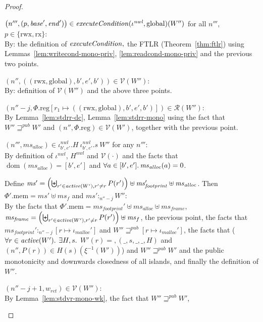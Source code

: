 \documentclass[a4paper]{article}
\newcommand{\update}[2]{[#1 \mapsto #2]}
\DeclareMathOperator{\dom}{dom}
\newcommand{\var}[1]{\mathit{#1}}
\newcommand{\hs}{\var{ms}}
\newcommand{\ms}{\hs}
\newcommand{\start}{\var{base}}
\newcommand{\addrend}{\var{end}}
\newcommand{\heap}{\var{mem}}
\newcommand{\nwl}{\var{nwl}}
\newcommand{\plainproj}[1]{\mathrm{#1}}
\newcommand{\memheap}[1][\Phi]{#1.\plainproj{mem}}
\newcommand{\memreg}[1][\Phi]{#1.\plainproj{reg}}
\newcommand{\plainfun}[2]{
  \ifthenelse{\equal{#2}{}}
  {\mathit{#1}}
  {\mathit{#1}(#2)}
}
\newcommand{\execCond}[1]{\plainfun{executeCondition}{#1}}
\newcommand{\activeReg}[1]{\plainfun{active}{#1}}
\newcommand{\futurewk}{\mathbin{\sqsupseteq}^{\var{pub}}}
\newcommand{\heapSat}[3][\heap]{#1 :_{#2} #3}
\newcommand{\codelabel}[1]{\mathit{#1}}
\newcommand{\malloc}{\codelabel{malloc}}
\newcommand{\asmType}{\plaindom{AsmType}}
\newcommand{\plaindom}[1]{\mathrm{#1}}
\newcommand{\intr}[2]{\mathcal{#1}}
\newcommand{\valueintr}[1]{\intr{V}{#1}}
\newcommand{\regintr}[1]{\intr{R}{#1}}
\newcommand{\stdvr}{\valueintr{\asmType}}
\newcommand{\stdrr}{\regintr{\asmType}}
\newcommand{\npair}[2][n]{\left(#1,#2 \right)}
\newcommand{\plainperm}[1]{\mathrm{#1}}
\newcommand{\exec}{\plainperm{rx}}
\newcommand{\rwx}{\plainperm{rwx}}
\newcommand{\glob}{\plainperm{global}}
\begin{document}
\begin{proof}
\begin{enumproof}
\begin{enumproof}
    \item
      $\npair[n''']{(p,\start',\addrend')}\in\execCond{\iota^\nwl,\glob}(W'')$
      for all $n'''$, $p \in \{\rwx,\exec\}$:\\
      By: the definition of $\execCond{}, $ the FTLR (Theorem~\ref{thm:ftlr})
      using Lemmas~\ref{lem:writecond-mono-priv}, \ref{lem:readcond-mono-priv}
      and the previous two points.
    \item $\npair[n'']{((\rwx,\glob),b',e',b')}\in\stdvr(W'')$:\\
      By: definition of $\stdvr(W'')$ and the above three points.
    \item
      $\npair[n''-j]{\memreg[\Phi]\update{r_1}{((\rwx,\glob),b',e',b')}}\in\stdrr(W'')$:\\
      By Lemma~\ref{lem:stdrr-dc}, Lemma~\ref{lem:stdrr-mono} using the fact
      that $W''\futurewk W'$ and $\npair[n'']{\memreg}\in\stdvr(W')$, together
      with the previous point.
    \item $\npair[n''']{\ms_{\var{alloc}}} \in \iota^\nwl_{b',e'}.H~
      \iota^\nwl_{b',e'}.s~ W''$ for any $n'''$:\\
      By definition of $\iota^\nwl$, $H^\nwl$ and $\stdvr(\cdot)$ and the facts
      that $\dom(\hs_{\var{alloc}}) = [b',e']$ and $\forall a
      \in [b',e']\ldotp \hs_{\var{alloc}}(a) = 0$.
    \item Define $\ms' = \left(\biguplus_{r'\in\activeReg{W'},r'\neq
          r}P(r')\right)\uplus \ms_{\var{footprint}}'\uplus\ms_{\var{alloc}}$.
      Then
      $\memheap[\Phi'] = \ms' \uplus \ms_f$ and $\heapSat[\ms']{n''-j}{W''}$:\\
      By the facts that $\memheap[\Phi']=\ms_{\var{footprint}}' \uplus
      \hs_{\var{alloc}} \uplus \ms_{\var{frame}}$, $\ms_{\var{frame}} =
      \left(\biguplus_{r'\in\activeReg{W'},r'\neq r}P(r')\right)\uplus\ms_f$,
      the previous point, the facts that
      $\heapSat[\ms_{\var{footprint}}']{n''-j}{[r \mapsto \iota_\malloc']}$ and
      $W''\futurewk [r\mapsto\iota_\malloc']$, the facts that ($\forall r \in
      \activeReg{W'} \ldotp$ $\exists H,s \ldotp$ $W'(r) =, (\_,s,\_,\_,H)$ and
      $\npair[n'']{P(r)} \in H(s)(\xi^{-1}(W'))$) and $W'' \futurewk W'$ and the
      public monotonicity and downwards closedness of all islands, and finally
      the definition of $W''$.
    \item $\npair[n''-j+1]{w_{\var{ret}}} \in \stdvr(W'')$:\\
      By Lemma~\ref{lem:stdvr-mono-wk}, the fact that $W''\futurewk W'$,

\end{enumproof}
\end{enumproof}
\end{proof}
\end{document}
